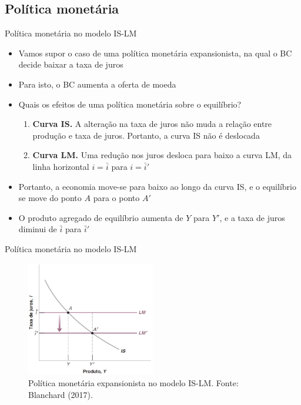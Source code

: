 \documentclass[10pt]{beamer}
\begin{document}
\subsection{Política monetária}
\begin{frame}{Política monetária no modelo IS-LM}
    \begin{itemize}
        \item Vamos supor o caso de uma política monetária expansionista, na qual o BC decide baixar a taxa de juros
        \bigskip
        \item Para isto, o BC aumenta a oferta de moeda
        \bigskip
        \item Quais os efeitos de uma política monetária sobre o equilíbrio?
        \bigskip
        \begin{enumerate}
            \item \textbf{Curva IS.} A alteração na taxa de juros não muda a relação entre produção e taxa de juros. Portanto, a curva IS não é deslocada
            \bigskip
            \item \textbf{Curva LM.} Uma redução nos juros desloca para baixo a curva LM, da linha horizontal $i = \bar{i}$ para $i = \bar{i}'$
        \end{enumerate}
        \bigskip
        \item Portanto, a economia move-se para baixo ao longo da curva IS, e o equilíbrio se move do ponto $A$ para o ponto $A'$
        \bigskip
        \item O produto agregado de equilíbrio aumenta de $Y$ para $Y'$, e a taxa de juros diminui de $\bar{i}$ para $\bar{i}'$
    \end{itemize}
\end{frame}

\begin{frame}{Política monetária no modelo IS-LM}
    \begin{figure}
        \centering
        \includegraphics[width=0.5\textwidth]{./figures/aula082_fig6.JPG}
        \caption{Política monetária expansionista no modelo IS-LM. Fonte: Blanchard (2017).}
        \label{fig:polmon}
    \end{figure}
\end{frame}
\end{document}
